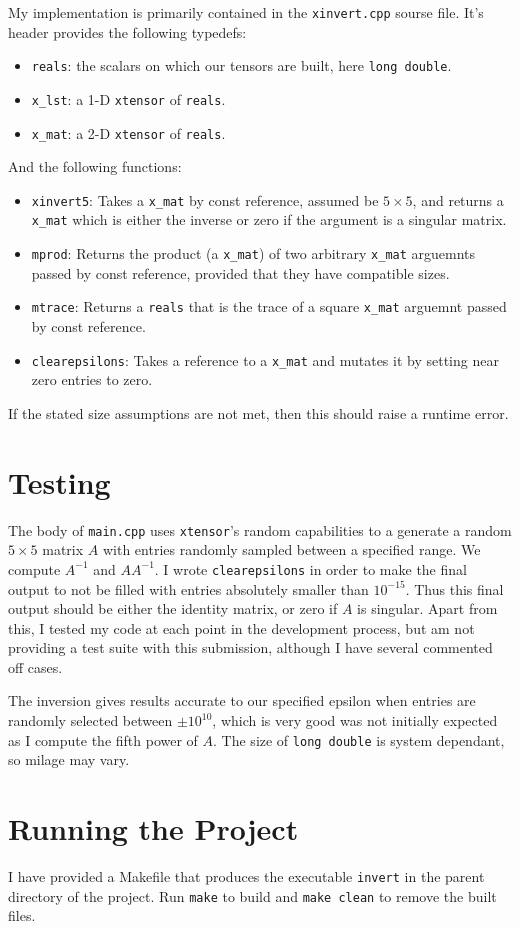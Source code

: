 \documentclass{amsart}
\begin{document}
My implementation is primarily contained in the \texttt{xinvert.cpp} sourse file. It's header provides the following typedefs:
\begin{itemize}
    \item \texttt{reals}: the scalars on which our tensors are built, here \texttt{long double}.
    \item \texttt{x\_lst}: a 1-D \texttt{xtensor} of \texttt{reals}.
    \item \texttt{x\_mat}: a 2-D \texttt{xtensor} of \texttt{reals}.
\end{itemize}
And the following functions:

\begin{itemize}
    \item \texttt{xinvert5}: Takes a \texttt{x\_mat} by const reference, assumed be $5 \times 5$, and returns a \texttt{x\_mat} which is either the inverse or zero if the argument is a singular matrix.
    \item \texttt{mprod}: Returns the product (a \texttt{x\_mat}) of two arbitrary \texttt{x\_mat} arguemnts passed by const reference, provided that they have compatible sizes.
    \item \texttt{mtrace}: Returns a \texttt{reals} that is the trace of a square \texttt{x\_mat} arguemnt passed by const reference.
    \item \texttt{clearepsilons}: Takes a reference to a \texttt{x\_mat} and mutates it by setting near zero entries to zero.
\end{itemize}
If the stated size assumptions are not met, then this should raise a runtime error.

\section*{Testing}

The body of \texttt{main.cpp} uses \texttt{xtensor}'s random capabilities to a generate a random $5 \times 5$ matrix $A$ with entries randomly sampled between a specified range. We compute $A^{-1}$ and $AA^{-1}$. I wrote \texttt{clearepsilons} in order to make the final output to not be filled with entries absolutely smaller than $10^{-15}$. Thus this final output should be either the identity matrix, or zero if $A$ is singular. Apart from this, I tested my code at each point in the development process, but am not providing a test suite with this submission, although I have several commented off cases.

The inversion gives results accurate to our specified epsilon when entries are randomly selected between $\pm 10^{10}$, which is very good was not initially expected as I compute the fifth power of $A$. The size of \texttt{long double} is system dependant, so milage may vary.

\section*{Running the Project}

I have provided a Makefile that produces the executable \texttt{invert} in the parent directory of the project. Run \texttt{make} to build and \texttt{make clean} to remove the built files.
\end{document}
